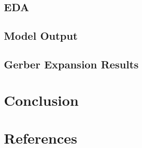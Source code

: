 \documentclass[12pt,twoside]{reedthesis}
\begin{document}
  \section{EDA}\label{eda-1}
  
  \section{Model Output}\label{model-output}
  
  \section{Gerber Expansion Results}\label{gerber-expansion-results}
  
  \chapter*{Conclusion}\label{conclusion}
  
  \setcounter{chapter}{4} \setcounter{section}{0}
  
  \appendix
  
  \backmatter
  
  \chapter{References}\label{references}
  
  \noindent
  
  \setlength{\parindent}{-0.20in} \setlength{\leftskip}{0.20in}
  \setlength{\parskip}{8pt}


\end{document}
